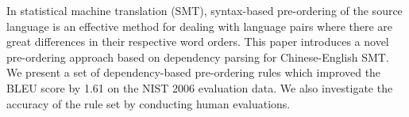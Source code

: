 In statistical machine translation (SMT), syntax-based pre-ordering of the source language is an effective method for dealing with language pairs where there are great differences in their respective word orders. This paper introduces a novel pre-ordering approach based on dependency parsing for Chinese-English SMT. We present a set of dependency-based pre-ordering rules which improved the BLEU score by 1.61 on the NIST 2006 evaluation data. We also investigate the accuracy of the rule set by conducting human evaluations.
